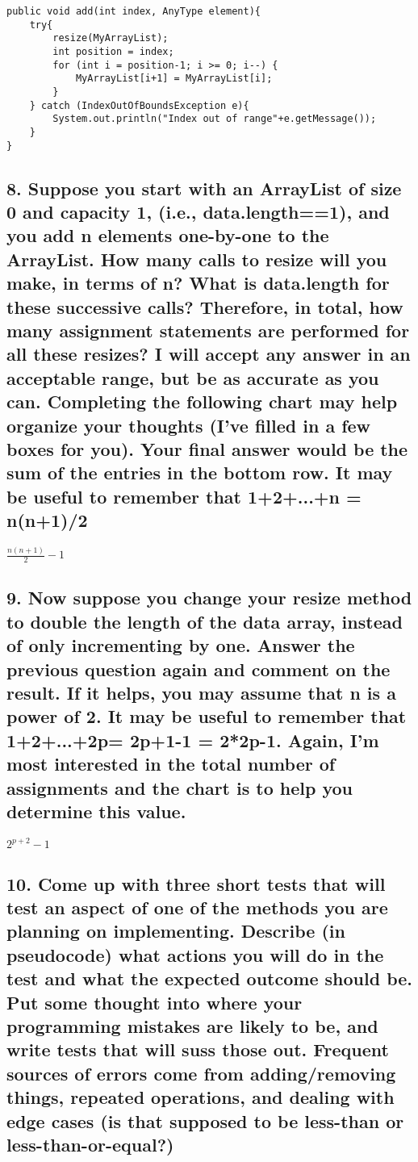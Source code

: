 \documentclass[a4paper,11pt]{article}
\theoremstyle{mytheor}
\begin{document}
\begin{lstlisting}
public void add(int index, AnyType element){
    try{
        resize(MyArrayList);
        int position = index;
        for (int i = position-1; i >= 0; i--) {                
            MyArrayList[i+1] = MyArrayList[i];
        }
    } catch (IndexOutOfBoundsException e){
        System.out.println("Index out of range"+e.getMessage());
    }
}
\end{lstlisting}


\subsection*{8. Suppose you start with an ArrayList of size 0 and capacity 1, (i.e., data.length==1), and you add n elements one-by-one to the ArrayList. How many calls to resize will you make, in terms of n? What is data.length for these successive calls? Therefore, in total, how many assignment statements are performed for all these resizes? I will accept any answer in an acceptable range, but be as accurate as you can. Completing the following chart may help organize your thoughts (I've filled in a few boxes for you). Your final answer would be the sum of the entries in the bottom row. It may be useful to remember that 1+2+...+n = n(n+1)/2}
\begin{center}
$\frac{n(n+1)}{2}-1$
\end{center}

\subsection*{9. Now suppose you change your resize method to double the length of the data array, instead of only incrementing by one. Answer the previous question again and comment on the result. If it helps, you may assume that n is a power of 2. It may be useful to remember that 1+2+...+2p= 2p+1-1 = 2*2p-1. Again, I'm most interested in the total number of assignments and the chart is to help you determine this value.}
\begin{center}
$2^{p+2}-1$
\end{center}

\subsection*{10. Come up with three short tests that will test an aspect of one of the methods you are planning on implementing. Describe (in pseudocode) what actions you will do in the test and what the expected outcome should be. Put some thought into where your programming mistakes are likely to be, and write tests that will suss those out. Frequent sources of errors come from adding/removing things, repeated operations, and dealing with edge cases (is that supposed to be less-than or less-than-or-equal?)}
\end{document}
